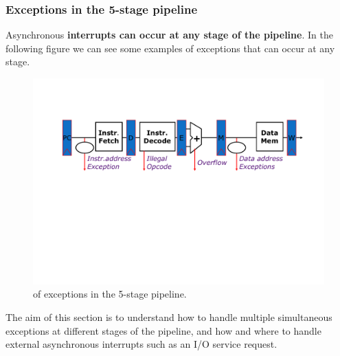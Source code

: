 \subsubsection{Exceptions in the 5-stage pipeline}

Asynchronous \textbf{interrupts can occur at any stage of the pipeline}. In the following figure we can see some examples of exceptions that can occur at any stage.
\begin{figure}[!htp]
    \centering
    \includegraphics[width=.9\textwidth]{img/exceptions-in-the-5-stage-pipeline-1.pdf}
    \caption{ of exceptions in the 5-stage pipeline.}
\end{figure}

\noindent
The aim of this section is to understand how to handle multiple simultaneous exceptions at different stages of the pipeline, and how and where to handle external asynchronous interrupts such as an I/O service request.

